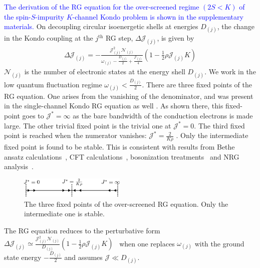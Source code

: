 \documentclass[reprint,prb,superscriptaddress]{revtex4-2}
\begin{document}
\textcolor{blue}{The derivation of the RG equation for the over-screened regime \((2S < K)\) of the spin-\(S\)-impurity \(K\)-channel Kondo problem is shown in the supplementary materials.}
On decoupling circular isoenergetic shells at energies \(D_{(j)}\), the change in the Kondo coupling at the \(j^\text{th}\) RG step, \(\Delta {\mathcal{J}}_{(j)}\), is given by
\begin{equation}\begin{aligned}
	\Delta {\mathcal{J}}_{(j)} = -\frac{{\mathcal{J}}_{(j)}^2 \mathcal{N}_{(j)}}{\omega_{(j)} - \frac{D_{(j)}}{2} + \frac{{\mathcal{J}}_{(j)}}{4}}\left( 1 - \frac{1}{2}\rho {\mathcal{J}}_{(j)} K \right) 
\end{aligned}\end{equation}
\(\mathcal{N}_{(j)}\) is the number of electronic states at the energy shell \(D_{(j)}\). We work in the low quantum fluctuation regime \(\omega_{(j)} < \frac{D_{(j)}}{2}\). There are three fixed points of the RG equation. One arises from the vanishing of the denominator, and was present in the single-channel Kondo RG equation as well \cite{kondo_urg}. As shown there, this fixed-point goes to \({\mathcal{J}}^* = \infty\) as the bare bandwidth of the conduction electrons is made large. The other trivial fixed point is the trivial one at \({\mathcal{J}}^* = 0\). The third fixed point is reached when the numerator vanishes: \({\mathcal{J}}^* = \frac{2}{K \rho}\) \cite{Gan_mchannel_1994,Kogan_2018,Kuramoto1998,Noz_blandin_1980}. Only the intermediate fixed point is found to be stable. This is consistent with results from Bethe ansatz calculations~\cite{Tsvelick_Weigmann_mchannel_1984,andrei_destri_1984,zarand_costi_2002,andrei_jerez_1995,Tsvelick_1985,Tsvelick1984}, CFT calculations~\cite{affleck_1991_overscreen,affleck1993exact,affleck_ludwig_1991}, bosonization treatments~\cite{emery_kivelson,vondelft_prl_1998} and NRG analysis~\cite{pang_cox_1991,mitchell_bulla_2014}.
\begin{figure}[htpb]
	\centering
	\includegraphics[width=0.45\textwidth]{plt/rg_flow.pdf}
	\caption{The three fixed points of the over-screened RG equation. Only the intermediate one is stable.}
	\label{rg_flow}
\end{figure}

The RG equation reduces to the perturbative form \(\Delta {\mathcal{J}}_{(j)} \simeq \frac{{\mathcal{J}}_{(j)}^2 \mathcal{N}_{(j)}}{D_{(j)}}\left( 1 - \frac{1}{2}\rho {\mathcal{J}}_{(j)} K \right)\)~\cite{Kogan_2018,Kuramoto1998,Noz_blandin_1980,tripathi2018landau} when one replaces \(\omega_{(j)}\) with the ground state energy \(-\frac{D_{(j)}}{2}\) and assumes \({\mathcal{J}} \ll D_{(j)}\).
\end{document}
